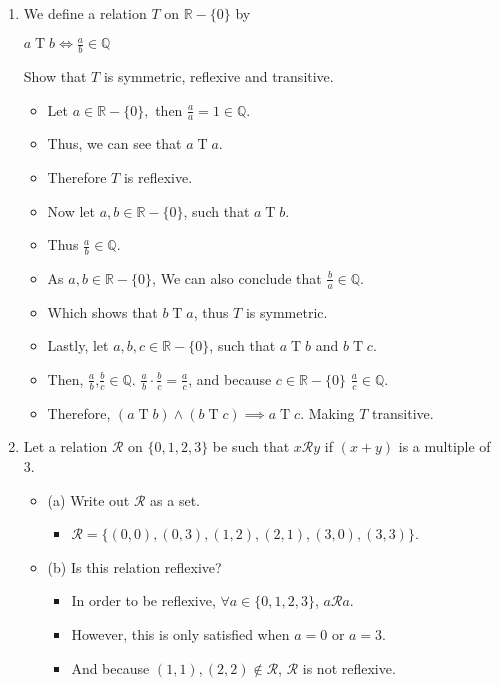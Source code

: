 \documentclass[letterpaper,12pt]{article}
\begin{document}
\begin{enumerate}
\item We define a relation $T$ on $\mathbb{R} - \{0\}$ by 
\begin{center}
$a \mathrel T b \Longleftrightarrow \frac{a}{b} \in \mathbb{Q}$	
\end{center}
Show that $T$ is symmetric, reflexive and transitive.
\begin{itemize}
	\item Let $a \in \mathbb{R} - \{0\}, $ then $\frac{a}{a} = 1 \in \mathbb{Q}$.
	\item Thus, we can see that $a \mathrel T a$.
	\item Therefore $T$ is reflexive.
	\item Now let $a,b \in \mathbb{R} - \{0\}$, such that $a \mathrel Tb$.
	\item Thus $\frac{a}{b} \in \mathbb{Q}$.
	\item As $a,b \in \mathbb{R} - \{0\}$, We can also conclude that $\frac{b}{a} \in \mathbb{Q}$.
	\item Which shows that $b \mathrel T a$, thus $T$ is symmetric.
	\item Lastly, let $a,b,c \in \mathbb{R} - \{0\}$, such that $a \mathrel T b$ and $ b \mathrel T c$.
	\item Then, $\frac{a}{b}$,$\frac{b}{c} \in \mathbb{Q}$. $\frac{a}{b} \cdot \frac{b}{c} = \frac{a}{c}$, and because $c\in \mathbb{R} - \{0\}$ $\frac{a}{c}\in \mathbb{Q}$.
	\item Therefore, $(a \mathrel T b )\wedge (b \mathrel T c )\implies a \mathrel T c$. Making $T$ transitive.
\end{itemize}
\item Let a relation $\mathcal{R}$ on $\{0,1,2,3\}$ be such that $x \mathrel \mathcal{R} y$ if $(x+y)$ is a multiple of 3.
\begin{itemize}
	\item (a) Write out $\mathcal{R}$ as a set.
	\begin{itemize}
	\item $\mathcal{R} = \{(0,0),(0,3),(1,2),(2,1),(3,0),(3,3)\}$. 
	\end{itemize}
	\item (b) Is this relation reflexive?
	\begin{itemize}
	\item In order to be reflexive, $\forall a \in \{0,1,2,3\} $, $a \mathrel \mathcal{R}a$.
	\item However, this is only satisfied when $a =0$ or $a=3$. 
	\item And because $(1,1),(2,2) \notin \mathcal{R}$, $\mathcal R $ is not reflexive.

\end{itemize}
\end{itemize}
\end{enumerate}
\end{document}
